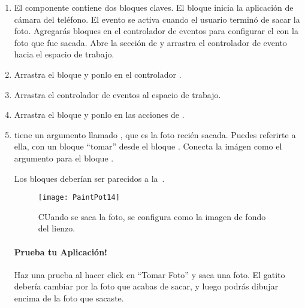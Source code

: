 \begin{enumerate}

\item El componente  contiene dos bloques claves. El
  bloque  inicia la aplicación de cámara del
  teléfono. El evento  se activa
  cuando el usuario terminó de sacar la foto. Agregarás bloques en el
  controlador de eventos  para
  configurar el  con la foto que
  fue sacada. Abre la sección de  y arrastra el
  controlador de evento  hacia el espacio
  de trabajo.

\item Arrastra el bloque  y ponlo en el
  controlador .

\item Arrastra el controlador de eventos
   al espacio de trabajo.

\item Arrastra el bloque  y
  ponlo en las acciones de .

\item {} tiene un argumento
  llamado , que es la foto recién sacada. Puedes
  referirte a ella, con un bloque ``tomar'' desde el bloque
  . Conecta la imágen como el
  argumento para el bloque .
	
  Los bloques deberían ser parecidos a la~.

\begin{figure}[H]
\centering
\texttt{[image: PaintPot14]}
\caption{CUando se saca la foto, se configura como la imagen de fondo
  del lienzo.}
\label{fig:PaintPot14}
\end{figure}

\paragraph{Prueba tu Aplicación!} Haz una prueba al hacer click en
``Tomar Foto'' y saca una foto. El gatito debería cambiar por la foto
que acabas de sacar, y luego podrás dibujar encima de la foto que
sacaste.

\end{enumerate}

